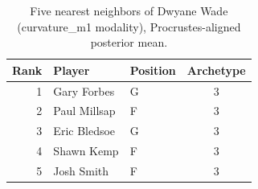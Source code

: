 \begin{table}[htbp]
  \centering\small
  \begin{tabular}{rllc}
    \toprule
    Rank & Player & Position & Archetype \\
    \midrule
    1 & Gary Forbes & G & 3 \\
    2 & Paul Millsap & F & 3 \\
    3 & Eric Bledsoe & G & 3 \\
    4 & Shawn Kemp & F & 3 \\
    5 & Josh Smith & F & 3 \\
    \bottomrule
  \end{tabular}
  \caption{Five nearest neighbors of Dwyane Wade (curvature_m1 modality), Procrustes-aligned posterior mean.}
  \label{tab:Dwyane_Wade_neighbors_curvature_m1}
\end{table}

